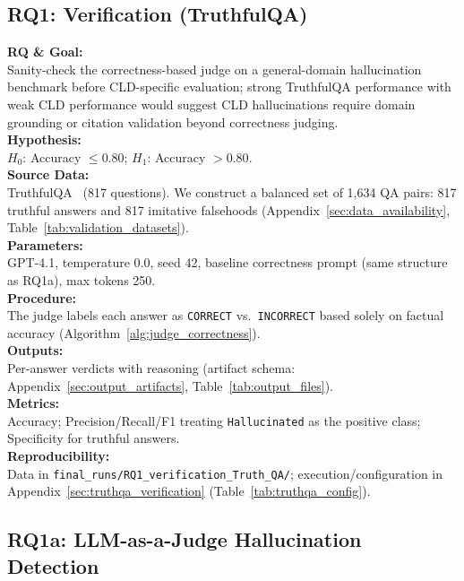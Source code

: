\subsection{RQ1: Verification (TruthfulQA)}
\label{sec:rq1_verification}

\noindent\textbf{RQ \& Goal:}\\
Sanity-check the correctness-based judge on a general-domain hallucination benchmark before CLD-specific evaluation; strong TruthfulQA performance with weak CLD performance would suggest CLD hallucinations require domain grounding or citation validation beyond correctness judging.\\
\textbf{Hypothesis:}\\
$H_0$: Accuracy $\leq 0.80$; $H_1$: Accuracy $> 0.80$.\\
\textbf{Source Data:}\\
TruthfulQA~\cite{lin2022truthfulqa} (817 questions). We construct a balanced set of 1{,}634 QA pairs: 817 truthful answers and 817 imitative falsehoods (Appendix~\ref{sec:data_availability}, Table~\ref{tab:validation_datasets}).\\
\textbf{Parameters:}\\
GPT-4.1, temperature 0.0, seed 42, baseline correctness prompt (same structure as RQ1a), max tokens 250.\\
\textbf{Procedure:}\\
The judge labels each answer as \texttt{CORRECT} vs.\ \texttt{INCORRECT} based solely on factual accuracy (Algorithm~\ref{alg:judge_correctness}).\\
\textbf{Outputs:}\\
Per-answer verdicts with reasoning (artifact schema: Appendix~\ref{sec:output_artifacts}, Table~\ref{tab:output_files}).\\
\textbf{Metrics:}\\
Accuracy; Precision/Recall/F1 treating \texttt{Hallucinated} as the positive class; Specificity for truthful answers.\\
\textbf{Reproducibility:}\\
Data in \texttt{final\_runs/RQ1\_verification\_Truth\_QA/}; execution/configuration in Appendix~\ref{sec:truthqa_verification} (Table~\ref{tab:truthqa_config}).

\subsection{RQ1a: LLM-as-a-Judge Hallucination Detection}
\label{sec:rq1a_experiments}

